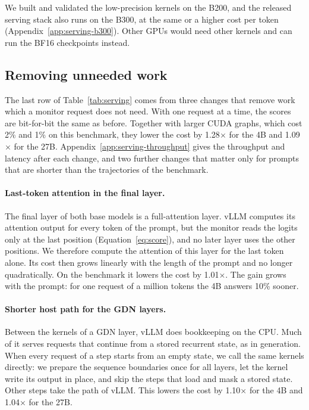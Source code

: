 We built and validated the low-precision kernels on the B200, and the released serving stack also runs on the B300, at the same or a higher cost per token (Appendix~\ref{app:serving-b300}).
Other GPUs would need other kernels and can run the BF16 checkpoints instead.

\subsection{Removing unneeded work}
\label{sec:serving-work}

The last row of Table~\ref{tab:serving} comes from three changes that remove work which a monitor request does not need.
With one request at a time, the scores are bit-for-bit the same as before.
Together with larger CUDA graphs, which cost 2\% and 1\% on this benchmark, they lower the cost by 1.28$\times$ for the 4B and 1.09$\times$ for the 27B.
Appendix~\ref{app:serving-throughput} gives the throughput and latency after each change, and two further changes that matter only for prompts that are shorter than the trajectories of the benchmark.

\paragraph{Last-token attention in the final layer.}
The final layer of both base models is a full-attention layer.
vLLM computes its attention output for every token of the prompt, but the monitor reads the logits only at the last position (Equation~\ref{eq:score}), and no later layer uses the other positions.
We therefore compute the attention of this layer for the last token alone.
Its cost then grows linearly with the length of the prompt and no longer quadratically.
On the benchmark it lowers the cost by 1.01$\times$.
The gain grows with the prompt: for one request of a million tokens the 4B answers 10\% sooner.

\paragraph{Shorter host path for the GDN layers.}
Between the kernels of a GDN layer, vLLM does bookkeeping on the CPU.
Much of it serves requests that continue from a stored recurrent state, as in generation.
When every request of a step starts from an empty state, we call the same kernels directly: we prepare the sequence boundaries once for all layers, let the kernel write its output in place, and skip the steps that load and mask a stored state.
Other steps take the path of vLLM.
This lowers the cost by 1.10$\times$ for the 4B and 1.04$\times$ for the 27B.

